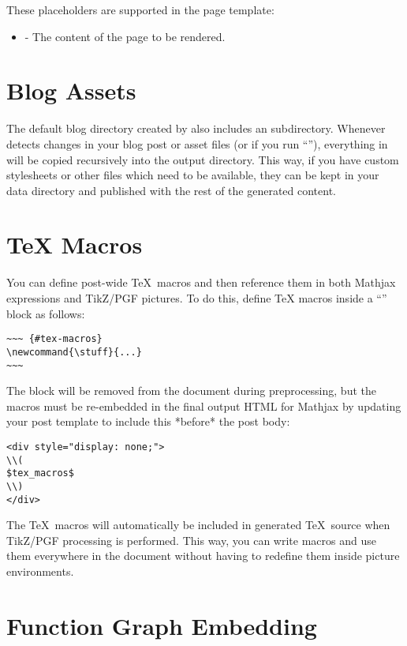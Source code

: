 \documentclass[11pt, letterpaper, oneside, titlepage]{book}
\begin{document}
These placeholders are supported in the page template:

\begin{itemize}
\item{ - The content of the page to be rendered.}
\end{itemize}

\section{Blog Assets}

The default blog directory created by  also includes an
 subdirectory.  Whenever  detects changes in your
blog post or asset files (or if you run ``''), everything in
 will be copied recursively into the output directory.
This way, if you have custom stylesheets or other files which need to
be available, they can be kept in your data directory and published
with the rest of the generated content.

\section{TeX Macros}

You can define post-wide \TeX\ macros and then reference them in both
Mathjax expressions and TikZ/PGF pictures.  To do this, define \TeX
macros inside a ``'' block as follows:

\begin{verbatim}
~~~ {#tex-macros}
\newcommand{\stuff}{...}
~~~
\end{verbatim}

The block will be removed from the document during preprocessing, but
the macros must be re-embedded in the final output HTML for Mathjax by
updating your post template to include this *before* the post body:

\begin{verbatim}
<div style="display: none;">
\\(
$tex_macros$
\\)
</div>
\end{verbatim}

The \TeX\ macros will automatically be included in generated
\TeX\ source when TikZ/PGF processing is performed.  This way, you can
write macros and use them everywhere in the document without having to
redefine them inside picture environments.

\section{Function Graph Embedding}
\end{document}
